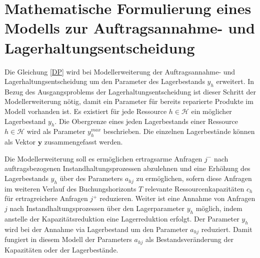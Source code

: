 \section{Mathematische Formulierung eines Modells zur Auftragsannahme- und Lagerhaltungsentscheidung}\label{Umformung}


Die Gleichung \eqref{DP} wird bei Modellerweiterung der Auftragsannahme- und Lagerhaltungsentscheidung um den Parameter des Lagerbestands $y_{h}$ erweitert. In Bezug des Ausgangsproblems der Lagerhaltungsentscheidung ist dieser Schritt der Modellerweiterung nötig, damit ein Parameter für bereits reparierte Produkte im Modell vorhanden ist. Es existiert für jede Ressource $h\in\mathcal{H}$ ein möglicher Lagerbestand $y_h$. Die Obergrenze eines jeden Lagerbestands einer Ressource $h\in\mathcal{H}$ wird als Parameter $y_{h}^{max}$ beschrieben. Die einzelnen Lagerbestände können als Vektor $\textbf{y}$ zusammengefasst werden. %


Die Modellerweiterung soll es ermöglichen ertragsarme Anfragen $j^{-}$ nach auftragsbezogenen Instandhaltungsprozessen abzulehnen und eine Erhöhung des Lagerbestands $y_{h}$ über des Parameters $a_{hj}$ zu ermöglichen, sofern diese Anfragen im weiteren Verlauf des Buchungshorizonts $T$ relevante Ressourcenkapazitäten $c_{h}$ für ertragreichere Anfragen $j^{+}$ reduzieren. Weiter ist eine Annahme von Anfragen $j$ nach Instandhaltungsprozessen über den Lagerparameter $y_{h}$ möglich, indem anstelle der Kapazitätsreduktion eine Lagerreduktion erfolgt. Der Parameter $y_{h}$ wird bei der Annahme via Lagerbestand um den Parameter $a_{hj}$ reduziert. Damit fungiert in diesem Modell der Parameters $a_{hj}$ als Bestandsveränderung der Kapazitäten oder der Lagerbestände. 


